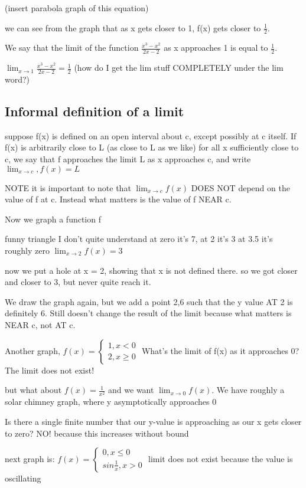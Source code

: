 \documentclass[12pt]{article}
\begin{document}
(insert parabola graph of this equation)

we can see from the graph that as x gets closer to 1, f(x) gets closer
to $\frac{1}{2}$.

We say that the limit of the function $\frac{x^3-x^2}{2x-2}$ as
x approaches 1 is equal to $\frac{1}{2}$.

$\lim_{x \to 1} \frac{x^3-x^2}{2x-2} = \frac{1}{2}$ (how do I get the
lim stuff COMPLETELY under the lim word?)

\subsection{Informal definition of a limit}
suppose f(x) is defined on an open interval about c, except possibly
at c itself. If f(x) is arbitrarily close to L (as close to L as we
like) for all x sufficiently close to c, we say that f approaches the
limit L as x approaches c, and write $\lim_{x \to c}, f(x) = L $

NOTE it is important to note that $\lim_{x \to c} f(x)$
DOES NOT depend on the value of f at c.
Instead what matters is the value of f NEAR c.

Now we graph a function f 

funny triangle I don't quite understand
at zero it's 7, at 2 it's 3 at 3.5 it's roughly zero
$\lim_{x \to 2} f(x) = 3$

now we put a hole at x = 2, showing that x is not defined there.
so we got closer and closer to 3, but never quite reach it.

We draw the graph again, but we add a point 2,6 such that the y value AT 2 is definitely 6. Still doesn't
change the result of the limit because what matters is NEAR c, not AT c.

Another graph, 
$f(x) = \left\{ \begin{array}{l}
1, x < 0\\
2, x \geq 0 \end{array} \right. $
What's the limit of f(x) as it approaches 0? The limit does not exist!

but what about $f(x) = \frac{1}{x^2}$ and we want $\lim_{x \to 0} f(x)$.
We have roughly a solar chimney graph, where y asymptotically approaches 0

Is there a single finite number that our y-value is approaching as our x gets closer to zero? NO!
because this increases without bound

next graph is: $f(x) = \left\{\begin{array}{l}
0,x \leq 0\\
sin \frac{1}{x}, x > 0
\end{array} \right. $
limit does not exist because the value is oscillating
\end{document}
